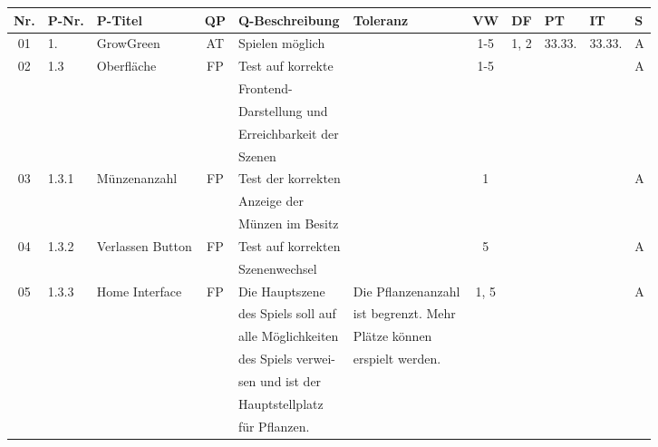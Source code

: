 \label{ch:anhang}

\begin{table}[H]\label{tab:quality}
    \footnotesize
    \begin{tabular}{|c|l|l|c|l|l|c|c|l|l|l|}
        \hline
        Nr. & P-Nr. & P-Titel & QP & Q-Beschreibung & Toleranz & VW & DF & PT & IT & S \\[0.5ex]
        \hline\hline
        01 & 1. & GrowGreen & AT & Spielen möglich & & 1-5 & 1, 2 & 33.33. & 33.33. & A \\
        \hline
        02 & 1.3 & Oberfläche & FP & Test auf korrekte &  & 1-5 &  &  &  & A \\
           &       &            &    & Frontend- &   &   & & & &\\
           &       &            &    & Darstellung und &   &   & & & &\\
           &       &            &    & Erreichbarkeit der &   &   & & & &\\
           &       &            &    & Szenen &   &   & & & &\\
        \hline
        03 & 1.3.1 & Münzenanzahl & FP & Test der korrekten &  & 1 &  &  &  & A \\
        &       &            &    & Anzeige der &   &   & & & &\\
        &       &            &    & Münzen im Besitz &   &   & & & &\\
        \hline
        04 & 1.3.2 & Verlassen Button & FP & Test auf korrekten &  & 5 &  &  &  & A \\
        &       &            &    & Szenenwechsel &   &   & & & &\\
        \hline
        05 & 1.3.3 & Home Interface & FP & Die Hauptszene & Die Pflanzenanzahl & 1, 5 &  &  &  & A \\
        &       &            &    & des Spiels soll auf &  ist begrenzt. Mehr  &   & & & &\\
        &       &            &    & alle Möglichkeiten & Plätze können  &   & & & &\\
        &       &            &    & des Spiels verwei- & erspielt werden.  &   & & & &\\
        &       &            &    & sen und ist der &   &   & & & &\\
        &       &            &    & Hauptstellplatz &   &   & & & &\\
        &       &            &    & für Pflanzen. &   &   & & & &\\

\end{tabular}
\end{table}
